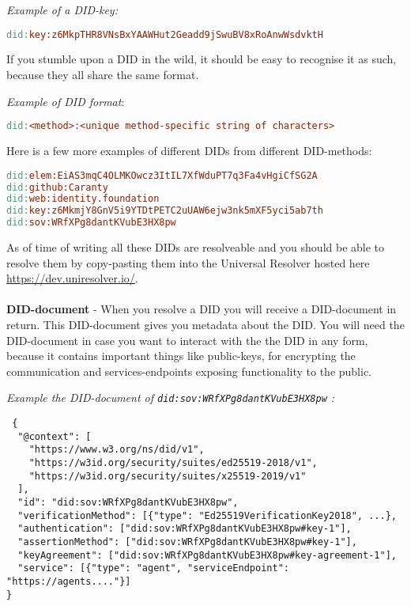 \emph{Example of a DID-key:}

\begin{lstlisting}[language=make]
did:key:z6MkpTHR8VNsBxYAAWHut2Geadd9jSwuBV8xRoAnwWsdvktH
\end{lstlisting}

If you stumble upon a DID in the wild, it should be easy to recognise it
as such, because they all share the same format.

\emph{Example of DID format}:

\begin{lstlisting}[language=make]
did:<method>:<unique method-specific string of characters>
\end{lstlisting}

Here is a few more examples of different DIDs from different
DID-methods:

\begin{lstlisting}[language=make]
did:elem:EiAS3mqC4OLMKOwcz3ItIL7XfWduPT7q3Fa4vHgiCfSG2A
did:github:Caranty
did:web:identity.foundation
did:key:z6MkmjY8GnV5i9YTDtPETC2uUAW6ejw3nk5mXF5yci5ab7th
did:sov:WRfXPg8dantKVubE3HX8pw
\end{lstlisting}

As of time of writing all these DIDs are resolveable and you should be
able to resolve them by copy-pasting them into the Universal Resolver hosted here
\url{https://dev.uniresolver.io/}.


\paragraph{}

\textbf{DID-document} - When you resolve a DID you will receive a DID-document in return. This
DID-document gives you metadata about the DID. You will need the
DID-document in case you want to interact with the the DID in any form,
because it contains important things like public-keys, for encrypting
the communication and services-endpoints exposing functionality to the
public.

\emph{Example the DID-document of \lstinline!did:sov:WRfXPg8dantKVubE3HX8pw! :}

\begin{lstlisting}
 {
  "@context": [
    "https://www.w3.org/ns/did/v1",
    "https://w3id.org/security/suites/ed25519-2018/v1",
    "https://w3id.org/security/suites/x25519-2019/v1"
  ],
  "id": "did:sov:WRfXPg8dantKVubE3HX8pw",
  "verificationMethod": [{"type": "Ed25519VerificationKey2018", ...},
  "authentication": ["did:sov:WRfXPg8dantKVubE3HX8pw#key-1"],
  "assertionMethod": ["did:sov:WRfXPg8dantKVubE3HX8pw#key-1"],
  "keyAgreement": ["did:sov:WRfXPg8dantKVubE3HX8pw#key-agreement-1"],
  "service": [{"type": "agent", "serviceEndpoint": "https://agents...."}]
}
\end{lstlisting}

